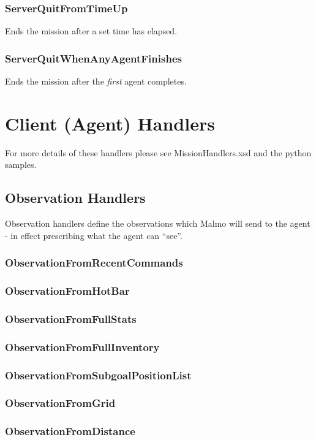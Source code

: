 \documentclass[11pt]{article} %
\begin{document}
\subsubsection{ServerQuitFromTimeUp}
Ends the mission after a set time has elapsed.

\subsubsection{ServerQuitWhenAnyAgentFinishes}
Ends the mission after the \emph{first} agent completes.

\section{Client (Agent) Handlers}
For more details of these handlers please see MissionHandlers.xsd and the python samples.

\subsection{Observation Handlers}
Observation handlers define the observations which Malmo will send to the agent - in effect prescribing what the agent can ``see''.

\subsubsection{ObservationFromRecentCommands}
\subsubsection{ObservationFromHotBar}
\subsubsection{ObservationFromFullStats}
\subsubsection{ObservationFromFullInventory}
\subsubsection{ObservationFromSubgoalPositionList}
\subsubsection{ObservationFromGrid}
\subsubsection{ObservationFromDistance}
\end{document}
